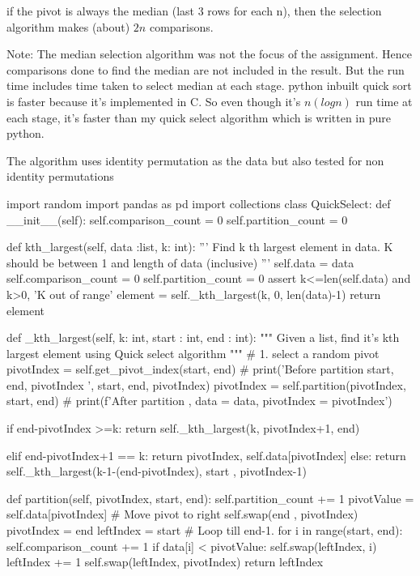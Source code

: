 \documentclass{homeworg}
\begin{document}
\begin{table}[htbp]
\end{table}

if the pivot is always the median (last 3 rows for each n), then the selection algorithm makes (about) $2n$ comparisons. 

Note:
The median selection algorithm was not the focus of the assignment. Hence comparisons done to find the median are not included in the result. But the run time includes time taken to select median at each stage. python inbuilt quick sort is faster because it's implemented in C. So even though it's $n (log n)$ run time at each stage, it's faster than my quick select algorithm which is written in pure python.

The algorithm uses identity permutation as the data but also tested for non identity permutations
\begin{python}

import random
import pandas as pd
import collections
class QuickSelect:
    def __init__(self):
        self.comparison_count = 0
        self.partition_count = 0

    def kth_largest(self, data :list, k: int):
        '''
        Find k th largest element in data. K should be between 1 and length of data (inclusive)
        '''
        self.data = data
        self.comparison_count = 0
        self.partition_count = 0
        assert k<=len(self.data) and k>0, 'K out of range'
        element =  self._kth_largest(k, 0, len(data)-1)
        return element
    
    def _kth_largest(self, k: int, start : int, end : int):
        """
        Given a list, find it's kth largest element using Quick select algorithm
        """
        # 1. select a random pivot
        pivotIndex = self.get_pivot_index(start, end)
        # print('Before partition start, end, pivotIndex ',  start, end, pivotIndex)
        pivotIndex = self.partition(pivotIndex, start, end)
        # print(f'After partition , data = {data}, pivotIndex = {pivotIndex}')

        if end-pivotIndex >=k:
            return self._kth_largest(k, pivotIndex+1, end)
            
        elif end-pivotIndex+1 == k:
            return pivotIndex, self.data[pivotIndex]
        else:
            return self._kth_largest(k-1-(end-pivotIndex), start , pivotIndex-1)

    def partition(self, pivotIndex, start, end):
        self.partition_count += 1
        pivotValue = self.data[pivotIndex]
        # Move pivot to right
        self.swap(end , pivotIndex)
        pivotIndex = end
        leftIndex = start
        # Loop till end-1.
        for i in range(start, end):
            self.comparison_count += 1
            if data[i] < pivotValue:
                self.swap(leftIndex, i)
                leftIndex += 1
        self.swap(leftIndex, pivotIndex)
        return leftIndex
    

\end{python}
\end{document}
